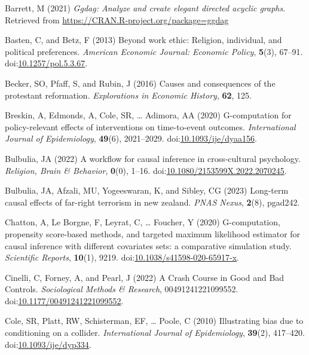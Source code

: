 \documentclass[
  singlecolumn,
  9pt]{article}
\newlength{\cslhangindent}
\newenvironment{CSLReferences}[2] %
 {\begin{list}{}{%
  \setlength{\itemindent}{0pt}
  \setlength{\leftmargin}{0pt}
  \setlength{\parsep}{0pt}
  \ifodd #1
   \setlength{\leftmargin}{\cslhangindent}
   \setlength{\itemindent}{-1\cslhangindent}
  \fi
  \setlength{\itemsep}{#2\baselineskip}}}
 {\end{list}}
\begin{document}
\label{refs}
\begin{CSLReferences}{1}{0}
Barrett, M (2021) \emph{Ggdag: Analyze and create elegant directed
acyclic graphs}. Retrieved from
\url{https://CRAN.R-project.org/package=ggdag}

Basten, C, and Betz, F (2013) Beyond work ethic: Religion, individual,
and political preferences. \emph{American Economic Journal: Economic
Policy}, \textbf{5}(3), 67--91.
doi:\href{https://doi.org/10.1257/pol.5.3.67}{10.1257/pol.5.3.67}.

Becker, SO, Pfaff, S, and Rubin, J (2016) Causes and consequences of the
protestant reformation. \emph{Explorations in Economic History},
\textbf{62}, 125.

Breskin, A, Edmonds, A, Cole, SR, \ldots{} Adimora, AA (2020)
G-computation for policy-relevant effects of interventions on
time-to-event outcomes. \emph{International Journal of Epidemiology},
\textbf{49}(6), 2021--2029.
doi:\href{https://doi.org/10.1093/ije/dyaa156}{10.1093/ije/dyaa156}.

Bulbulia, JA (2022) A workflow for causal inference in cross-cultural
psychology. \emph{Religion, Brain \& Behavior}, \textbf{0}(0), 1--16.
doi:\href{https://doi.org/10.1080/2153599X.2022.2070245}{10.1080/2153599X.2022.2070245}.

Bulbulia, JA, Afzali, MU, Yogeeswaran, K, and Sibley, CG (2023)
Long-term causal effects of far-right terrorism in new zealand.
\emph{PNAS Nexus}, \textbf{2}(8), pgad242.

Chatton, A, Le Borgne, F, Leyrat, C, \ldots{} Foucher, Y (2020)
G-computation, propensity score-based methods, and targeted maximum
likelihood estimator for causal inference with different covariates
sets: a comparative simulation study. \emph{Scientific Reports},
\textbf{10}(1), 9219.
doi:\href{https://doi.org/10.1038/s41598-020-65917-x}{10.1038/s41598-020-65917-x}.

Cinelli, C, Forney, A, and Pearl, J (2022) A Crash Course in Good and
Bad Controls. \emph{Sociological Methods \& Research},
00491241221099552.
doi:\href{https://doi.org/10.1177/00491241221099552}{10.1177/00491241221099552}.

Cole, SR, Platt, RW, Schisterman, EF, \ldots{} Poole, C (2010)
Illustrating bias due to conditioning on a collider. \emph{International
Journal of Epidemiology}, \textbf{39}(2), 417--420.
doi:\href{https://doi.org/10.1093/ije/dyp334}{10.1093/ije/dyp334}.


\end{CSLReferences}
\end{document}
